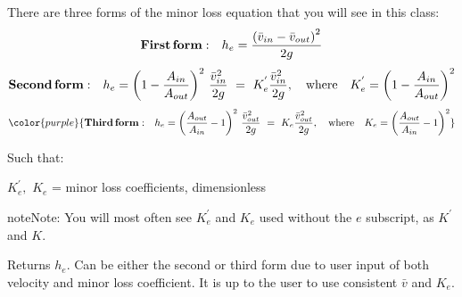 \documentclass[letterpaper,10pt,english]{sphinxmanual}
\begin{document}
There are three forms of the minor loss equation that you will see in this class:
\begin{equation}\label{equation:Fluids_Review/Fluids_Review_Design:Fluids_Review/Fluids_Review_Design:18}
\begin{split}{\rm{ \mathbf{First \, form:} }} \quad h_e = \frac{\left( \bar v_{in}  - \bar v_{out} \right)^2}{2g}\end{split}
\end{equation}\begin{equation}\label{equation:Fluids_Review/Fluids_Review_Design:Fluids_Review/Fluids_Review_Design:19}
\begin{split}{\rm{ \mathbf{Second \, form:} }} \quad h_e = \left( 1 - \frac{A_{in}}{A_{out}} \right)^2 \, \frac{\bar v_{in}^2}{2g} \, \, = \, \, K_e^{'} \frac{\bar v_{in}^2}{2g}, \quad {\rm where} \quad K_e^{'} = \left( 1 - \frac{A_{in}}{A_{out}} \right)^2\end{split}
\end{equation}\begin{equation}\label{equation:Fluids_Review/Fluids_Review_Design:Fluids_Review/Fluids_Review_Design:20}
\begin{split}\color{purple}{
{\rm{ \mathbf{Third \, form:} }} \quad h_e = \left( \frac{A_{out}}{A_{in}} -1 \right)^2 \, \frac{\bar  v_{out}^2}{2g} \, \, = \, \, K_e \frac{\bar v_{out}^2}{2g}, \quad {\rm where} \quad K_e = \left( \frac{A_{out}}{A_{in}} - 1 \right)^2
}\end{split}
\end{equation}
\begin{DUlineblock}{0em}
\item[] Such that:
\item[] \(K_e^{'}, \,\, K_e\) = minor loss coefficients, dimensionless
\end{DUlineblock}

\begin{sphinxadmonition}{note}{Note:}
You will most often see \(K_e^{'}\) and \(K_e\) used without the \(e\) subscript,  as \(K^{'}\) and \(K\).
\end{sphinxadmonition}




  Returns \(h_e\). Can be either the second or third form due to user input of both velocity and minor loss coefficient. It is up to the user to use consistent \(\bar v\) and \(K_e\).
\end{document}
